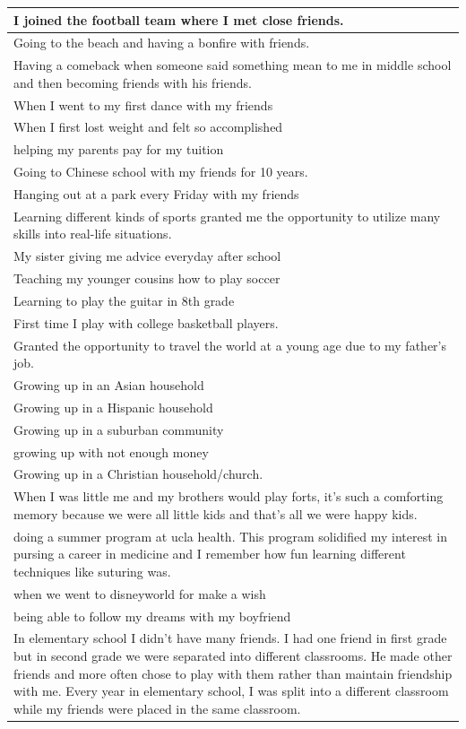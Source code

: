 \documentclass[
  .7em,
  letterpaper,
  DIV=11,
  numbers=noendperiod]{scrartcl}
\begin{document}
\begin{table}
\begin{tabular}{l}
I joined the football team where I met close friends.\\
\hline
Going to the beach and having a bonfire with friends.\\
\hline
Having a comeback when someone said something mean to me in middle school and then becoming friends with his friends.\\
\hline
When I went to my first dance with my friends\\
\hline
When I first lost weight and felt so accomplished\\
\hline
helping my parents pay for my tuition\\
\hline
Going to Chinese school with my friends for 10 years.\\
\hline
Hanging out at a park every Friday with my friends\\
\hline
Learning different kinds of sports granted me the opportunity to utilize many skills into real-life situations.\\
\hline
My sister giving me advice everyday after school\\
\hline
Teaching my younger cousins how to play soccer\\
\hline
Learning to play the guitar in 8th grade\\
\hline
First time I play with college basketball players.\\
\hline
Granted the opportunity to travel the world at a young age due to my father's job.\\
\hline
Growing up in an Asian household\\
\hline
Growing up in a Hispanic household\\
\hline
Growing up in a suburban community\\
\hline
growing up with not enough money\\
\hline
Growing up in a Christian household/church.\\
\hline
When I was little me and my brothers would play forts, it's such a comforting memory because we were all little kids and that's all we were happy kids.\\
\hline
doing a summer program at ucla health. This program solidified my interest in pursing a career in medicine and I remember how fun learning different techniques like suturing was.\\
\hline
when we went to disneyworld for make a wish\\
\hline
being able to follow my dreams with my boyfriend\\
\hline
In elementary school I didn’t have many friends. I had one friend in first grade but in second grade we were separated into different classrooms. He made other friends and more often chose to play with them rather than maintain friendship with me. Every year in elementary school, I was split into a different classroom while my friends were placed in the same classroom.\\

\end{tabular}
\end{table}
\end{document}
